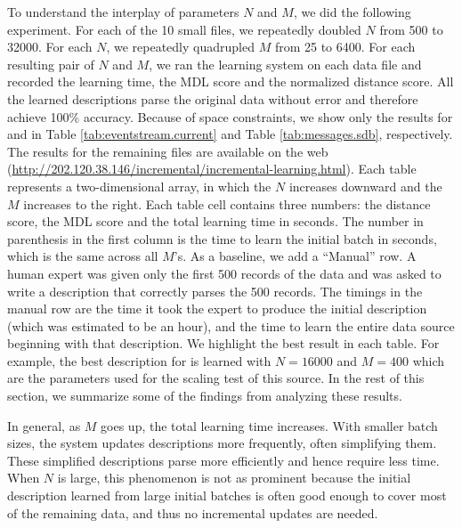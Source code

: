 To understand the interplay of parameters $N$ and $M$,
we did the following experiment. For each of the 10 small files,
we repeatedly doubled $N$ from 500 to 32000. 
For each $N$, we repeatedly quadrupled $M$ from 25 to 6400.  
For each resulting pair of $N$ and $M$, we ran the learning system on each data file and
recorded the learning time, the MDL score
and the normalized distance score. 
All the learned descriptions parse the original data
without error and therefore achieve 100\% accuracy. 
Because of space constraints, we show only
the results for  and  in
Table \ref{tab:eventstream.current} and Table \ref{tab:messages.sdb}, respectively.
The results for the remaining files are available on the web
(\url{http://202.120.38.146/incremental/incremental-learning.html}). 
Each table represents a two-dimensional array, in which the $N$
increases downward and the $M$ increases to the right.
Each table cell contains three numbers: the distance score, the MDL score
and the total learning time in seconds. The number in parenthesis in the first column
is the time to learn the initial batch in seconds, which is the same across all
$M$'s. As a baseline, we add a ``Manual'' row. 
A human expert was given
only the first 500 records of the data and was asked to write a \pads{}
description that correctly parses the 500 records. The timings in the manual
row are the time it took the expert to produce the initial description 
(which was estimated to be an hour), and the
time to learn the entire data source beginning with that description. 
We highlight the best result in each table. For example, the best description
for  is learned with $N=16000$ and $M=400$ which are the
parameters used for the scaling test of this source. 
In the rest of this section, we summarize some of the findings 
from analyzing these results.


In general, as $M$ goes up, the total learning time increases. 
With smaller batch sizes, the system updates descriptions 
more frequently, often simplifying them. These simplified descriptions 
parse more efficiently and
hence require less time. When $N$ is large, this phenomenon is not as prominent 
because the initial description learned from large
initial batches is often good enough to cover most of the remaining data,
and thus no incremental updates are needed.

